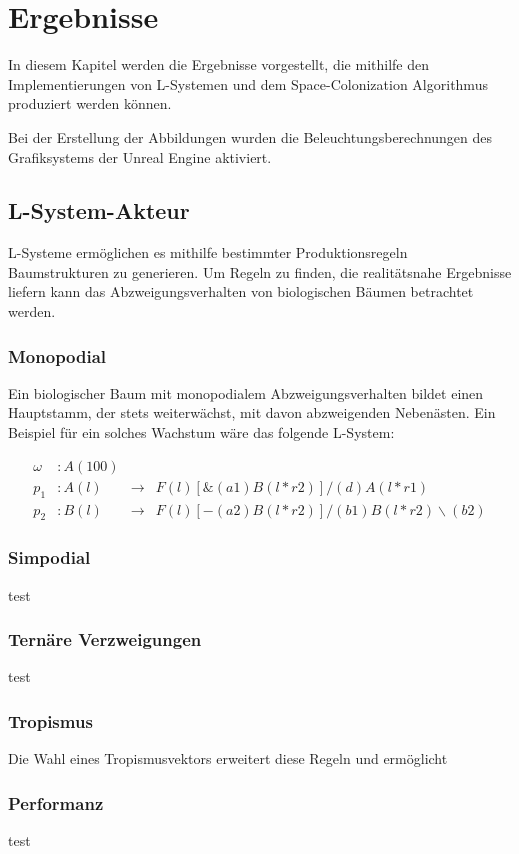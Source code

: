 \chapter{Ergebnisse}
In diesem Kapitel werden die Ergebnisse vorgestellt, die mithilfe den Implementierungen von L-Systemen und dem Space-Colonization Algorithmus produziert werden können.

Bei der Erstellung der Abbildungen wurden die Beleuchtungsberechnungen des Grafiksystems der Unreal Engine aktiviert.
\section{L-System-Akteur}
L-Systeme ermöglichen es mithilfe bestimmter Produktionsregeln Baumstrukturen zu generieren. Um Regeln zu finden, die realitätsnahe Ergebnisse liefern kann das Abzweigungsverhalten von biologischen Bäumen betrachtet werden. 
\subsection{Monopodial}
Ein biologischer Baum mit monopodialem Abzweigungsverhalten bildet einen Hauptstamm, der stets weiterwächst, mit davon abzweigenden Nebenästen. Ein Beispiel für ein solches Wachstum wäre das folgende L-System:

\begin{equation}
\begin{array}{llll}
\omega & : A(100) \\
p_1 & : A(l) &\rightarrow& F(l)[\&(a1)B(l*r2)]/(d)A(l*r1) \\
p_2 &  : B(l) &\rightarrow& F(l)[-(a2)B(l*r2)]/(b1)B(l*r2)\backslash(b2)
\end{array}
\label{eq:ProdMonopodial}
\end{equation} 
\subsection{Simpodial}
test
\subsection{Ternäre Verzweigungen}
test
\subsection{Tropismus}
Die Wahl eines Tropismusvektors erweitert diese Regeln und ermöglicht
\subsection{Performanz}
test
